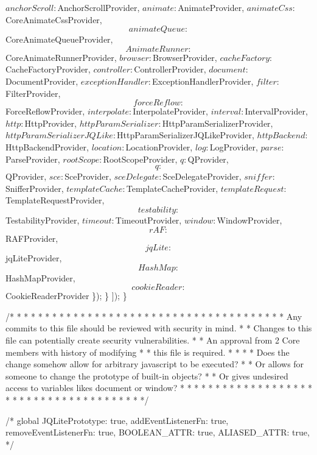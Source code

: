 \begin{DoxyCodeInclude}
{        $anchorScroll: $AnchorScrollProvider,
        $animate: $AnimateProvider,
        $animateCss: $CoreAnimateCssProvider,
        $$animateQueue: $$CoreAnimateQueueProvider,
        $$AnimateRunner: $$CoreAnimateRunnerProvider,
        $browser: $BrowserProvider,
        $cacheFactory: $CacheFactoryProvider,
        $controller: $ControllerProvider,
        $document: $DocumentProvider,
        $exceptionHandler: $ExceptionHandlerProvider,
        $filter: $FilterProvider,
        $$forceReflow: $$ForceReflowProvider,
        $interpolate: $InterpolateProvider,
        $interval: $IntervalProvider,
        $http: $HttpProvider,
        $httpParamSerializer: $HttpParamSerializerProvider,
        $httpParamSerializerJQLike: $HttpParamSerializerJQLikeProvider,
        $httpBackend: $HttpBackendProvider,
        $location: $LocationProvider,
        $log: $LogProvider,
        $parse: $ParseProvider,
        $rootScope: $RootScopeProvider,
        $q: $QProvider,
        $$q: $$QProvider,
        $sce: $SceProvider,
        $sceDelegate: $SceDelegateProvider,
        $sniffer: $SnifferProvider,
        $templateCache: $TemplateCacheProvider,
        $templateRequest: $TemplateRequestProvider,
        $$testability: $$TestabilityProvider,
        $timeout: $TimeoutProvider,
        $window: $WindowProvider,
        $$rAF: $$RAFProvider,
        $$jqLite: $$jqLiteProvider,
        $$HashMap: $$HashMapProvider,
        $$cookieReader: $$CookieReaderProvider
      \});
    \}
  ]);
\}

\textcolor{comment}{/* * * * * * * * * * * * * * * * * * * * * * * * * * * * * * * * * * * * * *}
\textcolor{comment}{ *     Any commits to this file should be reviewed with security in mind.  *}
\textcolor{comment}{ *   Changes to this file can potentially create security vulnerabilities. *}
\textcolor{comment}{ *          An approval from 2 Core members with history of modifying      *}
\textcolor{comment}{ *                         this file is required.                          *}
\textcolor{comment}{ *                                                                         *}
\textcolor{comment}{ *  Does the change somehow allow for arbitrary javascript to be executed? *}
\textcolor{comment}{ *    Or allows for someone to change the prototype of built-in objects?   *}
\textcolor{comment}{ *     Or gives undesired access to variables likes document or window?    *}
\textcolor{comment}{ * * * * * * * * * * * * * * * * * * * * * * * * * * * * * * * * * * * * * */}

\textcolor{comment}{/* global JQLitePrototype: true,}
\textcolor{comment}{  addEventListenerFn: true,}
\textcolor{comment}{  removeEventListenerFn: true,}
\textcolor{comment}{  BOOLEAN\_ATTR: true,}
\textcolor{comment}{  ALIASED\_ATTR: true,}
\textcolor{comment}{*/}

}
\end{DoxyCodeInclude}
